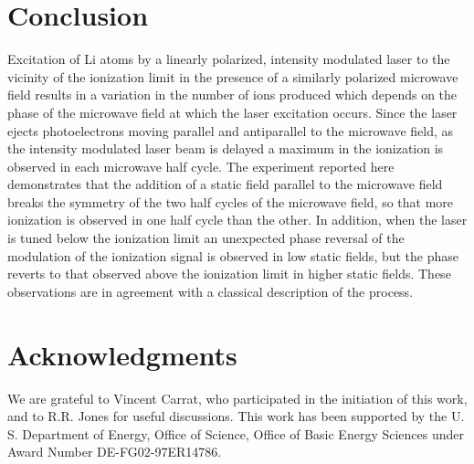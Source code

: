 \documentclass[aps,pra,reprint,groupedaddress]{revtex4-1}
\begin{document}
\section{\label{sec:conc} Conclusion}

Excitation of Li atoms by a linearly polarized, intensity modulated laser to the vicinity of the ionization limit in the presence of a similarly polarized microwave field results in a variation in the number of ions produced which depends on the phase of the microwave field at which the laser excitation occurs. Since the laser ejects photoelectrons moving parallel and antiparallel to the microwave field, as the intensity modulated laser beam is delayed a maximum in the ionization is observed in each microwave half cycle. The experiment reported here demonstrates that the addition of a static field parallel to the microwave field breaks the symmetry of the two half cycles of the microwave field, so that more ionization is observed in one half cycle than the other. In addition, when the laser is tuned below the ionization limit an unexpected phase reversal of the modulation of the ionization signal is observed in low static fields, but the phase reverts to that observed above the ionization limit in higher static fields. These observations are in agreement with a classical description of the process.

\section{\label{sec:ack} Acknowledgments}

We are grateful to Vincent Carrat, who participated in the initiation of this work, and to R.R. Jones for useful discussions. This work has been supported by the U. S. Department of Energy, Office of Science, Office of Basic Energy Sciences under Award Number DE-FG02-97ER14786.


\end{document}
